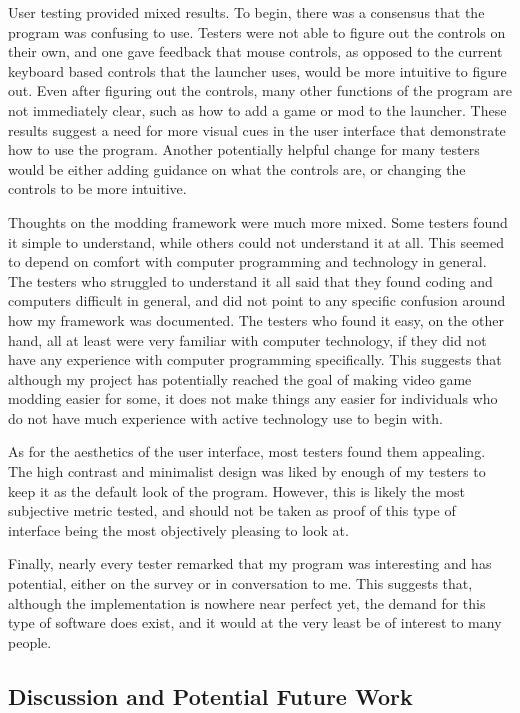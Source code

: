 \documentclass[10pt,twocolumn]{article}
\begin{document}
User testing provided mixed results. To begin, there was a consensus that
the program was confusing to use. Testers were not able to figure out the
controls on their own, and one gave feedback that mouse controls, as opposed
to the current keyboard based controls that the launcher uses, would be
more intuitive to figure out. Even after figuring out the controls,
many other functions of the program are not immediately clear, such as how
to add a game or mod to the launcher. These results suggest a need for
more visual cues in the user interface that demonstrate how to use the
program. Another potentially helpful change for many testers would be
either adding guidance on what the controls are, or changing the controls
to be more intuitive.

Thoughts on the modding framework were much more mixed. Some testers found it
simple to understand, while others could not understand it at all. This
seemed to depend on comfort with computer programming and technology in
general. The testers who struggled to understand it all said that they found
coding and computers difficult in general, and did not point to any specific
confusion around how my framework was documented. The testers who found it
easy, on the other hand, all at least were very familiar with computer
technology, if they did not have any experience with computer programming
specifically. This suggests that although my project has potentially
reached the goal of making video game modding easier for some, it does not
make things any easier for individuals who do not have much experience with
active technology use to begin with.

As for the aesthetics of the user interface, most testers found them
appealing. The high contrast and minimalist design was liked by enough
of my testers to keep it as the default look of the program. However,
this is likely the most subjective metric tested, and should not be taken
as proof of this type of interface being the most objectively pleasing
to look at.

Finally, nearly every tester remarked that my program was interesting and
has potential, either on the survey or in conversation to me. This suggests
that, although the implementation is nowhere near perfect yet, the demand
for this type of software does exist, and it would at the very least be
of interest to many people.

\subsection{Discussion and Potential Future Work}
\end{document}
